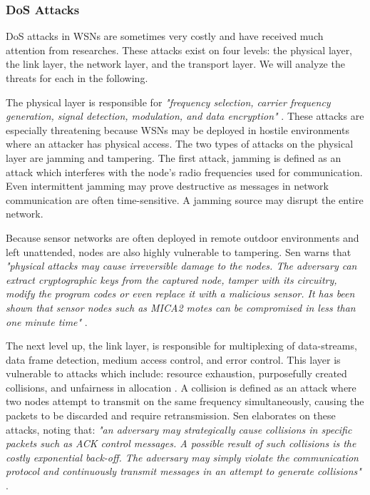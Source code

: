 \documentclass[12pt,a4paper,twoside]{report}
\begin{document}
\subsubsection{DoS Attacks}
DoS attacks in WSNs are sometimes very costly and have received much attention from researches. These attacks exist on four levels: the physical layer, the link layer, the network layer, and the transport layer. We will analyze the threats for each in the following. \par\par
The physical layer is responsible for \emph{"frequency selection, carrier frequency generation, signal detection, modulation, and data encryption"} \cite{sen:2009}. These attacks are especially threatening because WSNs may be deployed in hostile environments where an attacker has physical access. The two types of attacks on the physical layer are jamming and tampering. The first attack, jamming is defined as an attack which interferes with the node's radio frequencies used for communication. Even intermittent jamming may prove destructive as messages in network communication are often time-sensitive. A jamming source may disrupt the entire network. \par
Because sensor networks are often deployed in remote outdoor environments and left unattended, nodes are also highly vulnerable to tampering. Sen warns that \emph{"physical attacks may cause irreversible damage to the nodes. The adversary can extract cryptographic keys from the captured node, tamper with its circuitry, modify the program codes or even replace it with a malicious sensor. It has been shown that sensor nodes such as MICA2 motes can be compromised in less than one minute time"} \cite{sen:2009}.  \par\par
The next level up, the link layer, is responsible for multiplexing of data-streams, data frame detection, medium access control, and error control. This layer is vulnerable to attacks which include: resource exhaustion, purposefully created collisions, and unfairness in allocation \cite{sen:2009}. A collision is defined as an attack where two nodes attempt to transmit on the same frequency simultaneously, causing the packets to be discarded and require retransmission. Sen elaborates on these attacks, noting that: \emph{"an adversary may strategically cause collisions in specific packets such as ACK control messages. A possible result of such collisions is the costly exponential back-off. The adversary may simply violate the communication protocol and continuously transmit messages in an attempt to generate collisions"} \cite{sen:2009}. \par
\end{document}
